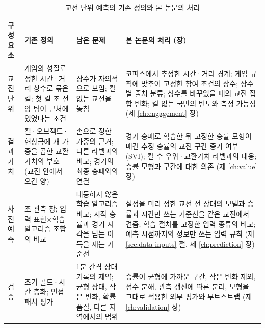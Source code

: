 \begin{table}[!t]
  \centering
  \caption{교전 단위 예측의 기존 정의와 본 논문의 처리}
  \label{tab:prior-vs-thesis}
  \footnotesize
  \begin{tabularx}{\linewidth}{@{}>{\raggedright\arraybackslash}p{1.7cm}>{\raggedright\arraybackslash}p{3.6cm}>{\raggedright\arraybackslash}p{3.3cm}X@{}}
    \toprule
    구성 요소 & 기존 정의 \cite{baek2026killconditioned} & 남은 문제 & 본 논문의 처리 (장) \\
    \midrule
    교전 단위 & 게임의 성질로 정한 시간·거리 상수로 묶은 킬; 첫 킬 \cogLead{}초 전 양 팀이 근처에 있었다는 조건 & 상수가 자의적으로 보임; 킬 없는 교전을 놓침 & 코퍼스에서 추정한 시간·거리 경계; 게임 규칙에 맞추어 고정한 참여 조건의 상수; 상수별 출처 분류; 상수를 바꾸었을 때의 교전 집합 변화; 킬 없는 국면의 빈도와 측정 가능성 (제 \ref{ch:engagement} 장) \\
    결과 가치 & 킬·오브젝트·현상금에 \cogWeights{}개 가중을 곱한 교환가치의 부호 (교전 안에서 오간 양) & 손으로 정한 가중의 근거; 다른 라벨과의 비교; 경기의 최종 승패와의 연결 & 경기 승패로 학습한 뒤 고정한 승률 모형이 매긴 추정 승률의 교전 구간 증가 여부(SVI); 킬 수 우위·교환가치 라벨과의 대응; 승률 모형과 구간에 대한 의존 (제 \ref{ch:value} 장) \\
    사전 예측 & \cogWindow{}초 관측 창; 입력 표현$\times$학습 알고리즘 조합의 비교 & 대등하지 않은 학습 알고리즘 비교; 시작 승률과 경기 시각을 넘는 이득을 재는 기준선 & 설정을 미리 정한 교전 전 상태의 모델과 승률과 시간만 쓰는 기준선을 같은 교전에서 견줌; 학습 절차를 고정한 입력 종류의 비교; 예측 시점까지의 정보만 쓰는 입력 규칙 (제 \ref{sec:data-inputs} 절, 제 \ref{ch:prediction} 장) \\
    검증 & 초기 골드·시간 층화; 인접 패치 평가 & 1분 간격 상태 기록의 제약; 균형 상태, 작은 변화, 확률 품질, 다른 지역에서의 범위 & 승률이 균형에 가까운 구간, 작은 변화 제외, 점수 분해, 관측 갱신에 따른 분리, 모형을 그대로 적용한 외부 평가와 부트스트랩 (제 \ref{ch:validation} 장) \\
    \bottomrule
  \end{tabularx}
\end{table}
